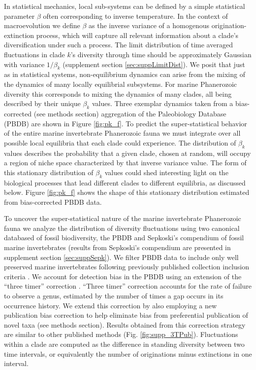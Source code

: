 In statistical mechanics, local sub-systems can be defined by a simple
statistical parameter $\beta$ often corresponding to inverse
temperature. In the context of macroevolution we define $\beta$ as the
inverse variance of a homogenous origination-extinction process, which
will capture all relevant information about a clade's diversification
under such a process.  The limit distribution of time averaged
fluctuations in clade $k$'s diversity through time should be
approximately Gaussian with variance $1/\beta_k$ (supplement section
\ref{sec:suppLimitDist}). We posit that just as in statistical
systems, non-equilibrium dynamics can arise from the mixing of the
dynamics of many locally equilibrial subsystems. For marine
Phanerozoic diversity this corresponds to mixing the dynamics of many
clades, all being described by their unique $\beta_k$ values.  Three
exemplar dynamics taken from a bias-corrected (see methods section)
aggregation of the Paleobiology Database (PBDB) \cite{alroy08} are
shown in Figure \ref{fig:pk_f}.
To predict the super-statistical behavior of the entire marine
invertebrate Phanerozoic fauna we must integrate over all possible
local equilibria that each clade could experience. The distribution of
$\beta_k$ values describes the probability that a given clade, chosen
at random, will occupy a region of niche space characterized by that
inverse variance value. The form of this stationary distribution of
$\beta_k$ values could shed interesting light on the biological
processes that lead different clades to different equilibria, as
discussed below.  Figure \ref{fig:pk_f} shows the shape of this
stationary distribution estimated from bias-corrected PBDB
\cite{alroy08} data.

To uncover the super-statistical nature of the marine invertebrate
Phanerozoic fauna we analyze the distribution of diversity
fluctuations using two canonical databased of fossil biodiversity, the
PBDB \cite{alroy08} and Sepkoski's compendium \cite{sepkoski1992} of
fossil marine invertebrates (results from Sepkoski's compendium are
presented in supplement section \ref{sec:suppSepk}).  We filter PBDB
data to include only well preserved marine invertebrates following
previously published collection inclusion criteria \cite{alroy08,
  alroy2010}.  We account for detection bias in the PBDB using an
extension of the ``three timer'' correction \cite{alroy08}. ``Three
timer'' correction accounts for the rate of failure to observe a
genus, estimated by the number of times a gap occurs in its occurrence
history. We extend this correction by also employing a new publication
bias correction to help eliminate bias from preferential publication
of novel taxa (see methods section). Results obtained from this
correction strategy are similar to other published methods
(Fig. \ref{fig:supp_3TPub}). Fluctuations within a clade are computed
as the difference in standing diversity between two time intervals, or
equivalently the number of originations minus extinctions in one
interval.

